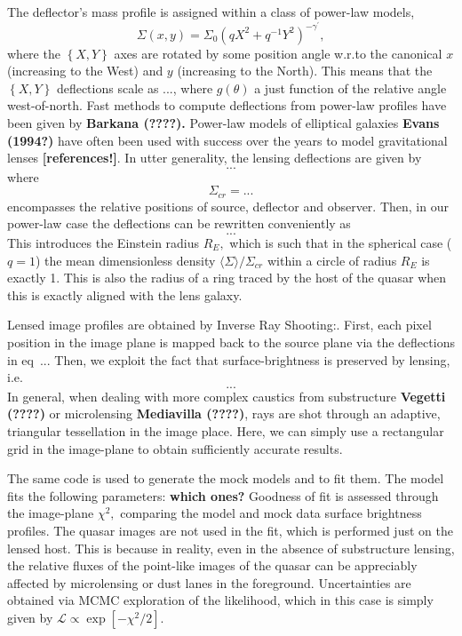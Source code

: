 \documentclass[a4paper,11pt]{article}
\begin{document}
The deflector's mass profile is assigned within a class of power-law models,
\begin{equation}
\Sigma(x,y)=\Sigma_{0}(q X^{2}+q^{-1}Y^{2})^{-\gamma^{\prime}},
\end{equation}
where the $\left\{X,Y\right\}$ axes are rotated by some position angle w.r.to the canonical $x$ (increasing to the West) and $y$ (increasing to the North). This means that the $\left\{X,Y\right\}$ deflections scale as ..., where $g(\theta)$ a just function of the relative angle west-of-north. Fast methods to compute deflections from power-law profiles have been given by \textbf{Barkana (????).} Power-law models of elliptical galaxies \textbf{Evans (1994?)} have often been used with success over the years to model gravitational lenses \textbf{[references!]}.
In utter generality, the lensing deflections are given by
\begin{equation}
...
\end{equation}
where
\begin{equation}
\Sigma_{cr}=...
\end{equation}
encompasses the relative positions of source, deflector and observer. Then, in our power-law case the deflections can be rewritten conveniently as
\begin{equation}
...
\end{equation}
This introduces the Einstein radius $R_E,$ which is such that in the spherical case ($q=1$) the mean dimensionless density $\langle\Sigma\rangle/\Sigma_{cr}$ within a circle of radius $R_E$ is exactly 1. This is also the radius of a ring traced by the host of the quasar when this is exactly aligned with the lens galaxy.

Lensed image profiles are obtained by Inverse Ray Shooting:. First, each pixel position in the image plane is mapped back to the source plane via the deflections in eq~... Then, we exploit the fact that surface-brightness is preserved by lensing, i.e.
\begin{equation}
...
\end{equation}
In general, when dealing with more complex caustics from substructure \textbf{Vegetti (????)} or microlensing \textbf{Mediavilla (????)},
 rays are shot through an adaptive, triangular tessellation in the image place.
 Here, we can simply use a rectangular grid in the image-plane to obtain sufficiently accurate results.

The same code is used to generate the mock models and to fit them. The model fits the following parameters: \textbf{which ones?}  Goodness of fit is assessed through the image-plane $\chi^{2},$ comparing the model and mock data surface brightness profiles. The quasar images are not used in the fit, which is performed just on the lensed host. This is because in reality, even in the absence of substructure lensing, the relative fluxes of the point-like images of the quasar can be appreciably affected by microlensing or dust lanes in the foreground. Uncertainties are obtained via MCMC exploration of the likelihood, which in this case is simply given by $\mathcal{L}\propto\exp[-\chi^{2}/2].$
\end{document}
